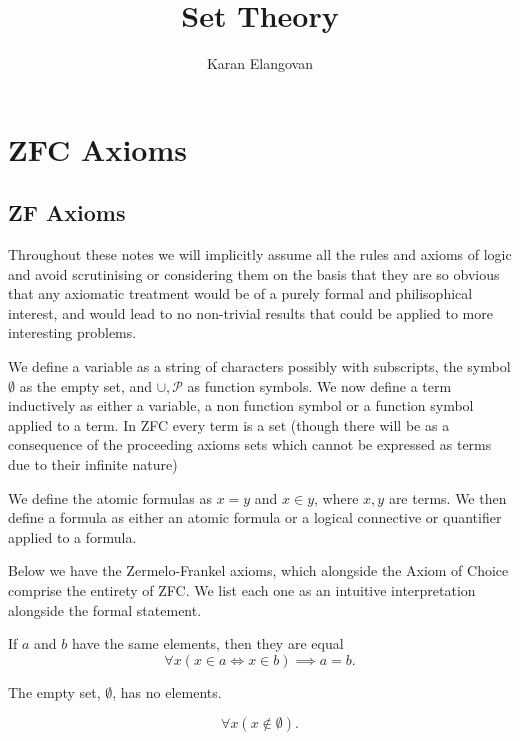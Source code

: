 \documentclass[]{article}
\title{Set Theory}
\author{Karan Elangovan}
\begin{document}
\maketitle

\doublespacing
\tableofcontents

\section{ZFC Axioms}

\subsection{ZF Axioms}

Throughout these notes we will implicitly assume all the rules and axioms of logic and avoid scrutinising or considering them on the basis that they are so obvious that any axiomatic treatment would be of a purely formal and philisophical interest, and would lead to no non-trivial results that could be applied to more interesting problems.

We define a variable as a string of characters possibly with subscripts, the symbol $\emptyset$ as the empty set, and $\cup, \mathcal{P}$ as function symbols. We now define a term inductively as either a variable, a non function symbol or a function symbol applied to a term. In ZFC every term is a set (though there will be as a consequence of the proceeding axioms sets which cannot be expressed as terms due to their infinite nature)

We define the atomic formulas as $x = y$ and $x \in y$, where $x, y$ are terms. We then define a formula as either an atomic formula or a logical connective or quantifier applied to a formula. 

Below we have the Zermelo-Frankel axioms, which alongside the Axiom of Choice comprise the entirety of ZFC. We list each one as an intuitive interpretation alongside the formal statement.

\begin{axiom} [Extensionality]
	If $a$ and $b$ have the same elements, then they are equal
	\[
			\forall x (x \in a \iff x \in b) \implies a = b
	.\] 
\end{axiom}

\begin{axiom} 
	The empty set, $\emptyset$, has no elements.

	\[
	\forall x (x \not \in \emptyset)	
	.\] 
\end{axiom}
\end{document}
